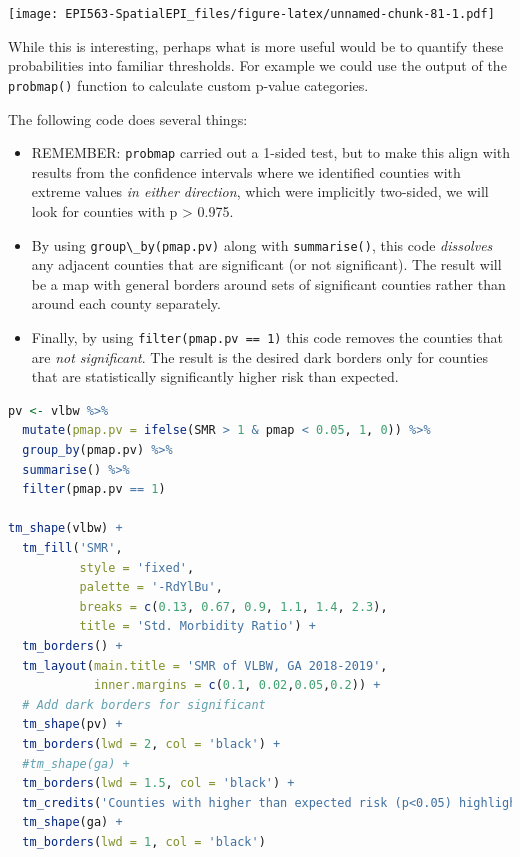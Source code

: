 \documentclass[
]{book}
\newcommand{\passthrough}[1]{#1}
\providecommand{\tightlist}{%
  \setlength{\itemsep}{0pt}\setlength{\parskip}{0pt}}
\begin{document}
\texttt{[image: EPI563-SpatialEPI\_files/figure-latex/unnamed-chunk-81-1.pdf]}

While this is interesting, perhaps what is more useful would be to quantify these probabilities into familiar thresholds. For example we could use the output of the \passthrough{\lstinline!probmap()!} function to calculate custom p-value categories.

The following code does several things:

\begin{itemize}
\tightlist
\item
  REMEMBER: \passthrough{\lstinline!probmap!} carried out a 1-sided test, but to make this align with results from the confidence intervals where we identified counties with extreme values \emph{in either direction}, which were implicitly two-sided, we will look for counties with p \textgreater{} 0.975.
\item
  By using \passthrough{\lstinline!group\_by(pmap.pv)!} along with \passthrough{\lstinline!summarise()!}, this code \emph{dissolves} any adjacent counties that are significant (or not significant). The result will be a map with general borders around sets of significant counties rather than around each county separately.
\item
  Finally, by using \passthrough{\lstinline!filter(pmap.pv == 1)!} this code removes the counties that are \emph{not significant}. The result is the desired dark borders only for counties that are statistically significantly higher risk than expected.
\end{itemize}

\begin{lstlisting}[language=R]
pv <- vlbw %>%
  mutate(pmap.pv = ifelse(SMR > 1 & pmap < 0.05, 1, 0)) %>%
  group_by(pmap.pv) %>%
  summarise() %>%
  filter(pmap.pv == 1)

tm_shape(vlbw) +
  tm_fill('SMR',
          style = 'fixed',
          palette = '-RdYlBu',
          breaks = c(0.13, 0.67, 0.9, 1.1, 1.4, 2.3),
          title = 'Std. Morbidity Ratio') + 
  tm_borders() +
  tm_layout(main.title = 'SMR of VLBW, GA 2018-2019',
            inner.margins = c(0.1, 0.02,0.05,0.2)) +
  # Add dark borders for significant
  tm_shape(pv) +
  tm_borders(lwd = 2, col = 'black') +
  #tm_shape(ga) + 
  tm_borders(lwd = 1.5, col = 'black') +
  tm_credits('Counties with higher than expected risk (p<0.05) highlighted with dark borders')+
  tm_shape(ga) +
  tm_borders(lwd = 1, col = 'black')
\end{lstlisting}
\end{document}
